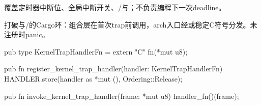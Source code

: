 覆盖定时器中断位、全局中断开关、/与；不负责编程下一次deadline。

打破与/的Cargo环：组合层在首次trap前调用，arch入口经或稳定C符号分发。未注册时panic。

\begin{rustcode}
pub type KernelTrapHandlerFn = extern "C" fn(*mut u8);

pub fn register_kernel_trap_handler(handler: KernelTrapHandlerFn) {
    HANDLER.store(handler as *mut (), Ordering::Release);
}

pub fn invoke_kernel_trap_handler(frame: *mut u8) {
    handler_fn()(frame);
}
\end{rustcode}
